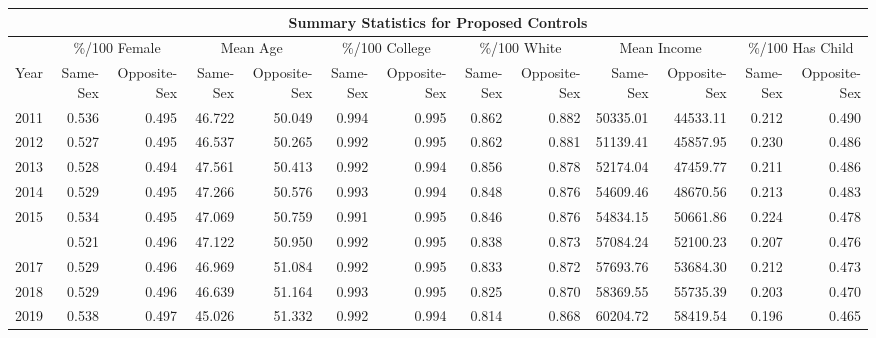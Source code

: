 
\centering
\begin{tabular}[t]{rrrrrrrrrrrrr}
\midrule %
\multicolumn{13}{c}{Summary Statistics for Proposed Controls} \\ \hline %
\multicolumn{1}{c}{ } & \multicolumn{2}{c}{\%/100 Female} & \multicolumn{2}{c}{Mean Age} & \multicolumn{2}{c}{\%/100 College} & \multicolumn{2}{c}{\%/100 White} & \multicolumn{2}{c}{Mean Income} & \multicolumn{2}{c}{\%/100 Has Child} \\
\cmidrule(l{3pt}r{3pt}){2-3} \cmidrule(l{3pt}r{3pt}){4-5} \cmidrule(l{3pt}r{3pt}){6-7} \cmidrule(l{3pt}r{3pt}){8-9} \cmidrule(l{3pt}r{3pt}){10-11} \cmidrule(l{3pt}r{3pt}){12-13}
Year & Same-Sex & Opposite-Sex & Same-Sex & Opposite-Sex & Same-Sex & Opposite-Sex & Same-Sex & Opposite-Sex & Same-Sex & Opposite-Sex & Same-Sex & Opposite-Sex\\
\midrule
2011 & 0.536 & 0.495 & 46.722 & 50.049 & 0.994 & 0.995 & 0.862 & 0.882 & 50335.01 & 44533.11 & 0.212 & 0.490\\
2012 & 0.527 & 0.495 & 46.537 & 50.265 & 0.992 & 0.995 & 0.862 & 0.881 & 51139.41 & 45857.95 & 0.230 & 0.486\\
2013 & 0.528 & 0.494 & 47.561 & 50.413 & 0.992 & 0.994 & 0.856 & 0.878 & 52174.04 & 47459.77 & 0.211 & 0.486\\
2014 & 0.529 & 0.495 & 47.266 & 50.576 & 0.993 & 0.994 & 0.848 & 0.876 & 54609.46 & 48670.56 & 0.213 & 0.483\\
2015 & 0.534 & 0.495 & 47.069 & 50.759 & 0.991 & 0.995 & 0.846 & 0.876 & 54834.15 & 50661.86 & 0.224 & 0.478\\
\addlinespace
2016 & 0.521 & 0.496 & 47.122 & 50.950 & 0.992 & 0.995 & 0.838 & 0.873 & 57084.24 & 52100.23 & 0.207 & 0.476\\
2017 & 0.529 & 0.496 & 46.969 & 51.084 & 0.992 & 0.995 & 0.833 & 0.872 & 57693.76 & 53684.30 & 0.212 & 0.473\\
2018 & 0.529 & 0.496 & 46.639 & 51.164 & 0.993 & 0.995 & 0.825 & 0.870 & 58369.55 & 55735.39 & 0.203 & 0.470\\
2019 & 0.538 & 0.497 & 45.026 & 51.332 & 0.992 & 0.994 & 0.814 & 0.868 & 60204.72 & 58419.54 & 0.196 & 0.465\\
\bottomrule
\end{tabular}
